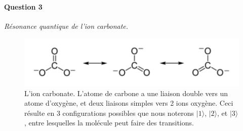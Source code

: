 \begin{enumerate}

\end{enumerate}

\paragraph{Question 3} \textit{Résonance quantique de l'ion carbonate.} \\

\begin{figure}[h!]
\begin{center}
\includegraphics[width=0.8\columnwidth]{Pictures/Carbonate1.pdf} 
\end{center}
\caption{L'ion carbonate. L'atome de carbone a une liaison double vers un atome d'oxygène, et deux liaisons simples vers 2 ions oxygène. Ceci résulte en 3 configurations possibles que nous noterons $\vert 1 \rangle$, $\vert 2 \rangle$, et $\vert 3 \rangle$, entre lesquelles la molécule peut faire des transitions.
}
\label{fig:Carbonate1}
\end{figure}

